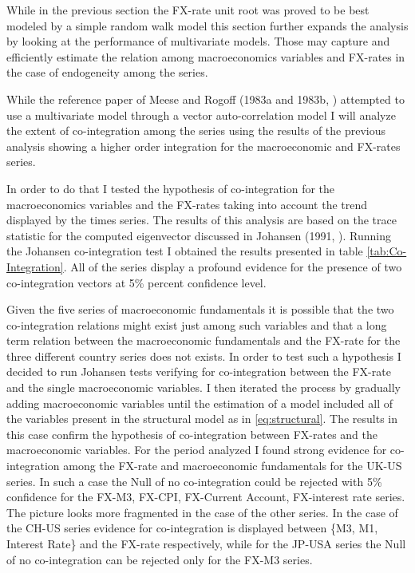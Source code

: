 While in the previous section the FX-rate unit root was proved to be
best modeled by a simple random walk model this section further
expands the analysis by looking at the performance of multivariate
models. Those may capture and efficiently estimate the relation among
macroeconomics variables and FX-rates in the case of endogeneity among
the series.

While the reference paper of Meese and Rogoff (1983a and 1983b,
\cite{MeeseRogoffa, MeeseRogoffb}) attempted to use a multivariate
model through a vector auto-correlation model I will analyze the
extent of co-integration among the series using the results of the
previous analysis showing a higher order integration for the
macroeconomic and FX-rates series.

In order to do that I tested the hypothesis of co-integration for the
macroeconomics variables and the FX-rates taking into account the
trend displayed by the times series. The results of this analysis are
based on the trace statistic for the computed eigenvector discussed in
Johansen (1991, \cite{Johansen}). Running the Johansen co-integration
test I obtained the results presented in table
\ref{tab:Co-Integration}. All of the series display a profound evidence
for the presence of two co-integration vectors at 5\% percent
confidence level.

Given the five series of macroeconomic fundamentals it is possible
that the two co-integration relations might exist just among such
variables and that a long term relation between the macroeconomic
fundamentals and the FX-rate for the three different country series does not
exists. In order to test such a hypothesis I decided to run
Johansen tests verifying for co-integration between the FX-rate and the
single macroeconomic variables. I then iterated the process by
gradually adding macroeconomic variables until the estimation of a
model included all of the variables present in the structural model as
in \ref{eq:structural}. The results in this case confirm the
hypothesis of co-integration between FX-rates and the macroeconomic
variables.  For the period analyzed I found strong evidence for
co-integration among the FX-rate and macroeconomic fundamentals for the
UK-US series. In such a case the Null of no co-integration could be
rejected with 5\% confidence for the FX-M3, FX-CPI, FX-Current
Account, FX-interest rate series.  The picture looks more fragmented
in the case of the other series. In the case of the CH-US series
evidence for co-integration is displayed between \{M3, M1, Interest
Rate\} and the FX-rate respectively, while for the JP-USA series the
Null of no co-integration can be rejected only for the FX-M3 series.

